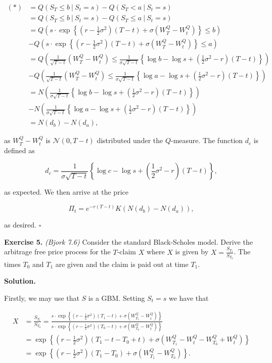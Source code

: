\documentclass[
]{book}
\begin{document}
\begin{align*}
(*)&=Q(S_T\le b\ \vert\ S_t=s)-Q(S_T<a\ \vert\ S_t=s)\\
&=Q(S_T\le b\ \vert\ S_t=s)-Q(S_T\le a\ \vert\ S_t=s)\\
&=Q\left(s\cdot \exp\left\{\left(r-\frac{1}{2}\sigma ^2\right)(T-t)+\sigma\left(W_T^Q-W_t^Q\right)\right\}\le b\right)\\
&-Q\left(s\cdot \exp\left\{\left(r-\frac{1}{2}\sigma ^2\right)(T-t)+\sigma\left(W_T^Q-W_t^Q\right)\right\}\le a\right)\\
&=Q\left(\frac{1}{\sqrt{T-t}}\left(W_T^Q-W_t^Q\right)\le\frac{1}{\sigma\sqrt{T-t}}\left\{\log b-\log s+\left(\frac{1}{2}\sigma ^2-r\right)(T-t)\right\}\right)\\
&-Q\left(\frac{1}{\sqrt{T-t}}\left(W_T^Q-W_t^Q\right)\le\frac{1}{\sigma\sqrt{T-t}}\left\{\log a-\log s+\left(\frac{1}{2}\sigma ^2-r\right)(T-t)\right\}\right)\\
&=N\left(\frac{1}{\sigma\sqrt{T-t}}\left\{\log b-\log s+\left(\frac{1}{2}\sigma ^2-r\right)(T-t)\right\}\right)\\
&-N\left(\frac{1}{\sigma\sqrt{T-t}}\left\{\log a-\log s+\left(\frac{1}{2}\sigma ^2-r\right)(T-t)\right\}\right)\\
&=N(d_b)-N(d_a),
\end{align*}

as \(W_T^Q-W_t^Q\) is \(\mathcal{N}(0,T-t)\) distributed under the \(Q\)-measure. The function \(d_c\) is defined as

\[
d_c=\frac{1}{\sigma\sqrt{T-t}}\left\{\log c-\log s+\left(\frac{1}{2}\sigma ^2-r\right)(T-t)\right\},
\]

as expected. We then arrive at the price

\[
\Pi_t=e^{-r(T-t)}K(N(d_b)-N(d_a)),
\]

as desired. \(\square\)

\textbf{Exercise 5.} \emph{(Bjork 7.6)} Consider the standard Black-Scholes model. Derive the arbitrage free price process for the \(T\)-claim \(X\) where \(X\) is given by \(X=\frac{S_{T_1}}{S_{T_0}}\). The times \(T_0\) and \(T_1\) are given and the claim is paid out at time \(T_1\).

\textbf{Solution.}

Firstly, we may use that \(S\) is a GBM. Setting \(S_t=s\) we have that

\begin{align*}
X&=\frac{S_{T_1}}{S_{T_0}}=\frac{s\cdot \exp\left\{\left(r-\frac{1}{2}\sigma^2\right)(T_1-t) +\sigma\left(W_{T_1}^Q-W_t^Q\right)\right\}}{s\cdot \exp\left\{\left(r-\frac{1}{2}\sigma^2\right)(T_0-t) +\sigma\left(W_{T_0}^Q-W_t^Q\right)\right\}}\\
&=\exp\left\{\left(r-\frac{1}{2}\sigma^2\right)(T_1-t-T_0+t) +\sigma\left(W_{T_1}^Q-W_t^Q-W_{T_0}^Q+W_t^Q\right)\right\}\\
&=\exp\left\{\left(r-\frac{1}{2}\sigma^2\right)(T_1-T_0) +\sigma\left(W_{T_1}^Q-W_{T_0}^Q\right)\right\}.
\end{align*}
\end{document}
